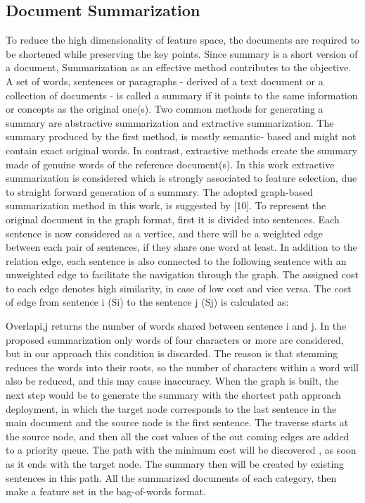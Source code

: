 \documentclass{sigchi}
\begin{document}
\subsection{Document Summarization}\label{sectionSummarization}
To reduce the high dimensionality of feature space, the
documents are required to be shortened while preserving the
key points. Since summary is a short version of a document,
Summarization as an effective method contributes to the
objective.
A set of words, sentences or paragraphs - derived of a text
document or a collection of documents - is called a summary
if it points to the same information or concepts as the original
one(s). Two common methods for generating a summary are
abstractive summarization and extractive summarization. The
summary produced by the first method, is mostly semantic-
based and might not contain exact original words. In contrast,
extractive methods create the summary made of genuine
words of the reference document(s). In this work extractive
summarization is considered which is strongly associated to
feature selection, due to straight forward generation of a
summary.
The adopted graph-based summarization method in this
work, is suggested by [10]. To represent the original document
in the graph format, first it is divided into sentences. Each
sentence is now considered as a vertice, and there will be a
weighted edge between each pair of sentences, if they share
one word at least. In addition to the relation edge, each
sentence is also connected to the following sentence with an
unweighted edge to facilitate the navigation through the graph.
The assigned cost to each edge denotes high similarity, in
case of low cost and vice versa. The cost of edge from
sentence i (Si) to the sentence j (Sj) is calculated as:

Overlapi,j returns the number of words shared between
sentence i and j. In the proposed summarization only words of
four characters or more are considered, but in our approach
this condition is discarded. The reason is that stemming
reduces the words into their roots, so the number of characters
within a word will also be reduced, and this may cause
inaccuracy.
When the graph is built, the next step would be to generate
the summary with the shortest path approach deployment, in
which the target node corresponds to the last sentence in the
main document and the source node is the first sentence. The
traverse starts at the source node, and then all the cost values
of the out coming edges are added to a priority queue. The
path with the minimum cost will be discovered , as soon as it
ends with the target node. The summary then will be created
by existing sentences in this path. All the summarized
documents of each category, then make a feature set in the
bag-of-words format.
\end{document}
